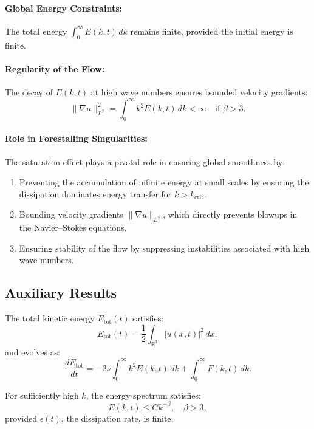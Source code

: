 \documentclass[12pt]{article}
\theoremstyle{definition}
\begin{document}
\paragraph{Global Energy Constraints:}
The total energy $\int_0^\infty E(k, t) \, dk$ remains finite, provided the initial energy is finite.

\paragraph{Regularity of the Flow:}
The decay of $E(k, t)$ at high wave numbers ensures bounded velocity gradients:
\[
\|\nabla u\|_{L^2}^2 = \int_0^\infty k^2 E(k, t) \, dk < \infty \quad \text{if } \beta > 3.
\]

\paragraph{Role in Forestalling Singularities:}
The saturation effect plays a pivotal role in ensuring global smoothness by:
\begin{enumerate}
    \item Preventing the accumulation of infinite energy at small scales by ensuring the dissipation dominates energy transfer for $k > k_{\text{crit}}$.
    \item Bounding velocity gradients $\|\nabla u\|_{L^2}$, which directly prevents blowups in the Navier--Stokes equations.
    \item Ensuring stability of the flow by suppressing instabilities associated with high wave numbers.
\end{enumerate}

\subsection{Auxiliary Results}

\begin{lemma}
The total kinetic energy $E_{\text{tot}}(t)$ satisfies:
\[
E_{\text{tot}}(t) = \frac{1}{2} \int_{\mathbb{R}^3} |u(x,t)|^2 \, dx,
\]
and evolves as:
\[
\frac{dE_{\text{tot}}}{dt} = -2\nu \int_0^\infty k^2 E(k,t) \, dk + \int_0^\infty F(k,t) \, dk.
\]
\end{lemma}

\begin{lemma}
For sufficiently high $k$, the energy spectrum satisfies:
\[
E(k, t) \leq C k^{-\beta}, \quad \beta > 3,
\]
provided $\epsilon(t)$, the dissipation rate, is finite.
\end{lemma}
\end{document}
